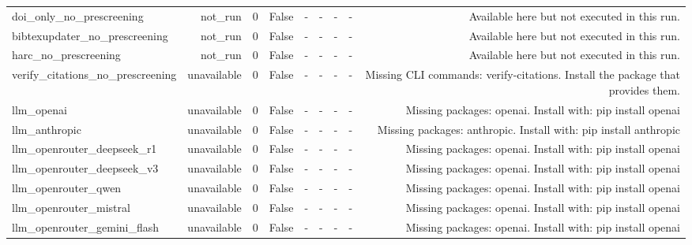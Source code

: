 \begin{tabular}{lrrrrrrrr}
doi\_only\_no\_prescreening & not\_run & 0 & False & - & - & - & - & Available here but not executed in this run. \\
bibtexupdater\_no\_prescreening & not\_run & 0 & False & - & - & - & - & Available here but not executed in this run. \\
harc\_no\_prescreening & not\_run & 0 & False & - & - & - & - & Available here but not executed in this run. \\
verify\_citations\_no\_prescreening & unavailable & 0 & False & - & - & - & - & Missing CLI commands: verify-citations. Install the package that provides them. \\
llm\_openai & unavailable & 0 & False & - & - & - & - & Missing packages: openai. Install with: pip install openai \\
llm\_anthropic & unavailable & 0 & False & - & - & - & - & Missing packages: anthropic. Install with: pip install anthropic \\
llm\_openrouter\_deepseek\_r1 & unavailable & 0 & False & - & - & - & - & Missing packages: openai. Install with: pip install openai \\
llm\_openrouter\_deepseek\_v3 & unavailable & 0 & False & - & - & - & - & Missing packages: openai. Install with: pip install openai \\
llm\_openrouter\_qwen & unavailable & 0 & False & - & - & - & - & Missing packages: openai. Install with: pip install openai \\
llm\_openrouter\_mistral & unavailable & 0 & False & - & - & - & - & Missing packages: openai. Install with: pip install openai \\
llm\_openrouter\_gemini\_flash & unavailable & 0 & False & - & - & - & - & Missing packages: openai. Install with: pip install openai \\
\bottomrule
\end{tabular}
